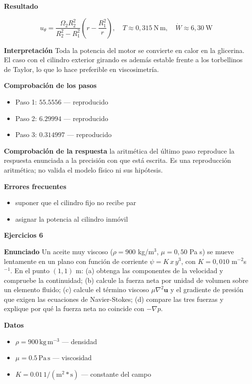 \documentclass[10pt,openany]{book}
\begin{document}
\noindent\textbf{Resultado}

\[
u_\theta = \frac{\Omega_2 R_2^{2}}{R_2^{2} - R_1^{2}}\left(r - \frac{R_1^{2}}{r}\right),\quad T \approx 0{,}315\ \mathrm{N\,m},\quad \dot W \approx 6{,}30\ \mathrm{W}
\]

\noindent\textbf{Interpretación}
Toda la potencia del motor se convierte en calor en la glicerina. El caso con el cilindro exterior girando es además estable frente a los torbellinos de Taylor, lo que lo hace preferible en viscosimetría.

\noindent\textbf{Comprobación de los pasos}
\begin{itemize}
\item Paso 1: $55.5556$ — reproducido
\item Paso 2: $6.29994$ — reproducido
\item Paso 3: $0.314997$ — reproducido
\end{itemize}

\noindent\textbf{Comprobación de la respuesta} la aritmética del último paso reproduce la respuesta enunciada a la precisión con que está escrita. Es una reproducción aritmética; no valida el modelo físico ni sus hipótesis.

\noindent\textbf{Errores frecuentes}
\begin{itemize}
\item suponer que el cilindro fijo no recibe par
\item asignar la potencia al cilindro inmóvil
\end{itemize}

\noindent\textbf{Ejercicios 6}

\noindent\textbf{Enunciado}
Un aceite muy viscoso (\(\rho = 900\) kg/m\(^3\), \(\mu = 0{,}50\) Pa s) se mueve lentamente en un plano con función de corriente \(\psi = K\,x\,y^{3}\), con \(K = 0{,}010\) m\(^{-2}\)s\(^{-1}\). En el punto \((1, 1)\) m: (a) obtenga las componentes de la velocidad y compruebe la continuidad; (b) calcule la fuerza neta por unidad de volumen sobre un elemento fluido; (c) calcule el término viscoso \(\mu\nabla^{2}\mathbf{u}\) y el gradiente de presión que exigen las ecuaciones de Navier-Stokes; (d) compare las tres fuerzas y explique por qué la fuerza neta no coincide con \(-\nabla p\).

\noindent\textbf{Datos}
\begin{itemize}
\item $\rho = 900\,\mathrm{kg}\,\mathrm{m}^{-3}$ — densidad
\item $\mu = 0.5\,\mathrm{Pa}\,\mathrm{s}$ — viscosidad
\item $K = 0.01\,\mathrm{1/(m^2*s)}$ — constante del campo
\end{itemize}
\end{document}
